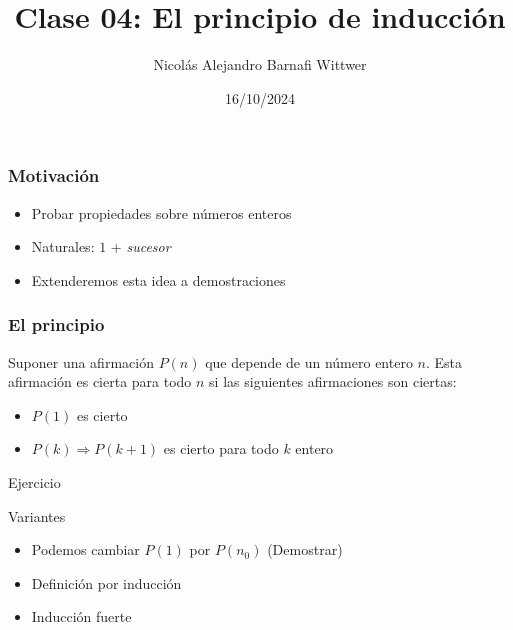 \documentclass[14pt,aspectratio=169,xcolor=dvipsnames]{beamer}
\title[short title]{Clase 04: El principio de inducción}
\subtitle{}
\author[NA Barnafi] {Nicolás Alejandro Barnafi Wittwer}
\institute[UC|CMM] 
{
    Pontificia Universidad Católica de Chile \\
    Centro de Modelamiento Matemático
}
\date{16/10/2024}
\begin{document}
\begin{frame}
    \maketitle
\end{frame}
\begin{frame}\frametitle{Motivación}
    \begin{itemize}
        \item Probar propiedades sobre números enteros
        \item Naturales: $1$ + \emph{sucesor}
        \item Extenderemos esta idea a demostraciones
    \end{itemize}
\end{frame}
\begin{frame}\frametitle{El principio}
    \begin{block}{}
        Suponer una afirmación $P(n)$ que depende de un número entero $n$. Esta afirmación es cierta para todo $n$ si las siguientes afirmaciones son ciertas:
        \begin{itemize}
            \item $P(1)$ es cierto 
            \item $P(k) \Rightarrow P(k+1)$ es cierto para todo $k$ entero
        \end{itemize}
    \end{block}
    \pause {}
\end{frame}
\begin{frame}{Ejercicio}
    \begin{center}
\end{center}
\end{frame}
\begin{frame}{Variantes}
    \begin{itemize}
        \item Podemos cambiar $P(1)$ por  $P(n_0)$ (Demostrar)
        \item Definición por inducción
        \item Inducción fuerte
    \end{itemize}
\end{frame}
\end{document}

